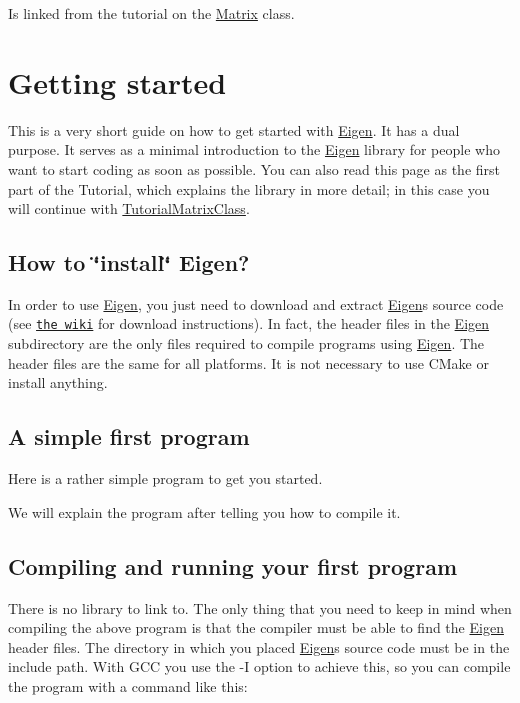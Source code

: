 Is linked from the tutorial on the \hyperlink{group___core___module_class_eigen_1_1_matrix}{Matrix} class. \hypertarget{GettingStarted}{}\section{Getting started}\label{GettingStarted}
This is a very short guide on how to get started with \hyperlink{namespace_eigen}{Eigen}. It has a dual purpose. It serves as a minimal introduction to the \hyperlink{namespace_eigen}{Eigen} library for people who want to start coding as soon as possible. You can also read this page as the first part of the Tutorial, which explains the library in more detail; in this case you will continue with \hyperlink{group___tutorial_matrix_class}{Tutorial\+Matrix\+Class}.\hypertarget{_getting_started_GettingStartedInstallation}{}\subsection{How to \char`\"{}install\char`\"{} Eigen?}\label{_getting_started_GettingStartedInstallation}
In order to use \hyperlink{namespace_eigen}{Eigen}, you just need to download and extract \hyperlink{namespace_eigen}{Eigen}\textquotesingle{}s source code (see \href{http://eigen.tuxfamily.org/index.php?title=Main_Page#Download}{\tt the wiki} for download instructions). In fact, the header files in the {\ttfamily \hyperlink{namespace_eigen}{Eigen}} subdirectory are the only files required to compile programs using \hyperlink{namespace_eigen}{Eigen}. The header files are the same for all platforms. It is not necessary to use C\+Make or install anything.\hypertarget{_getting_started_GettingStartedFirstProgram}{}\subsection{A simple first program}\label{_getting_started_GettingStartedFirstProgram}
Here is a rather simple program to get you started.


\begin{DoxyCodeInclude}
\end{DoxyCodeInclude}


We will explain the program after telling you how to compile it.\hypertarget{_getting_started_GettingStartedCompiling}{}\subsection{Compiling and running your first program}\label{_getting_started_GettingStartedCompiling}
There is no library to link to. The only thing that you need to keep in mind when compiling the above program is that the compiler must be able to find the \hyperlink{namespace_eigen}{Eigen} header files. The directory in which you placed \hyperlink{namespace_eigen}{Eigen}\textquotesingle{}s source code must be in the include path. With G\+CC you use the -\/I option to achieve this, so you can compile the program with a command like this\+:


